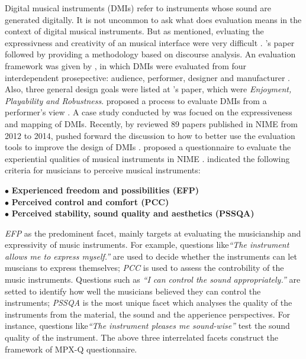 Digital musical instruments (DMIs) refer to instruments whose sound are generated digitally. It is not uncommon to ask what does evaluation means in the context of digital musical instruments. But as \citeauthor{Reference25} mentioned, evluating the expressivness and creativity of an musical interface were very difficult \citep{Reference25}. \citeauthor{Reference25}'s paper followed by providing a methodology based on discourse analysis. An evaluation framework was given by \citeauthor{Reference22}, in which DMIs were evaluated from four interdependent prosepective: audience, performer, designer and manufacturer \citep{Reference22}. Also, three general design goals were listed at \citeauthor{Reference22}'s paper, which were \textit{Enjoyment, Playability and Robustness}. \citeauthor{Reference23} proposed a process to evaluate DMIs from a performer's view \citep{Reference23}. A case study conducted by \citeauthor{Reference24} was focued on the expressiveness and mapping of DMIs. Recently, by reviewed 89 papers published in NIME from 2012 to 2014, \citeauthor{Reference26} pushed forward the discussion to how to better use the evaluation tools to improve the design of DMIs \citep{Reference26}. \citeauthor{Reference0} proposed a questionnaire to evaluate the experiential qualities of musical instruments in NIME \citep{Reference0}. \citeauthor{Reference0} indicated the following criteria for musicians to perceive musical instruments:
\begin{flushleft}
  \qquad \qquad $\bullet$ \textbf{Experienced freedom and possibilities (EFP)}\\
  \qquad \qquad $\bullet$ \textbf{Perceived control and comfort (PCC)} \\
  \qquad \qquad $\bullet$ \textbf{Perceived stability, sound quality and aesthetics (PSSQA)}\\
\end{flushleft}
\textit{EFP} as the predominent facet, mainly targets at evaluating the musicianship and expressivity of music instruments. For example, questions like\textit{\textquotedblleft{The instrument allows me to express myself.}\textquotedblright} are used to decide whether the instruments can let muscians to express themselves; \textit{PCC} is used to assess the controbility of the music instruments. Questions such as \textit{\textquotedblleft{I can control the sound appropriately.}\textquotedblright} are setted to identify how well the musicians believed they can control the instruments; \textit{PSSQA} is the most unique facet which analyses the quality of the instruments from the material, the sound and the apperience perspectives. For instance, questions like\textit{\textquotedblleft The instrument pleases me sound-wise\textquotedblright} test the sound quality of the instrument. The above three interrelated facets construct the framework of MPX-Q questionnaire.

\clearpage
